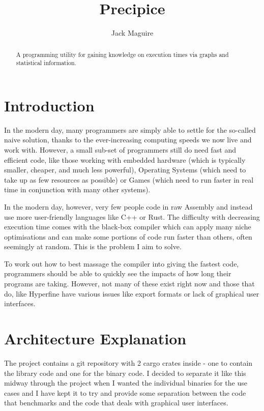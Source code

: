 \documentclass{article}
\title{Precipice}
\author{Jack Maguire}
\date{}
\begin{document}
\maketitle

\begin{abstract}
	A programming utility for gaining knowledge on execution times via graphs and statistical information.
\end{abstract}

\tableofcontents

\newpage

\begin{multicols*}{2}
\section{Introduction}

In the modern day, many programmers are simply able to settle for the so-called naive solution, thanks to the ever-increasing computing speeds we now live and work with. However, a small sub-set of programmers still do need fast and efficient code, like those working with embedded hardware (which is typically smaller, cheaper, and much less powerful), Operating Systems (which need to take up as few resources as possible) or Games (which need to run faster in real time in conjunction with many other systems).

In the modern day, however, very few people code in raw Assembly and instead use more user-friendly languages like C++ or Rust. The difficulty with decreasing execution time comes with the black-box compiler which can apply many niche optimisations and can make some portions of code run faster than others, often seemingly at random. This is the problem I aim to solve.

To work out how to best massage the compiler into giving the fastest code, programmers should be able to quickly see the impacts of how long their programs are taking. However, not many of these exist right now and those that do, like Hyperfine \autocite{peterHyperfine2023} have various issues like export formats or lack of graphical user interfaces.

\section{Architecture Explanation}

The project contains a git repository with 2 cargo crates inside - one to contain the library code and one for the binary code. I decided to separate it like this midway through the project when I wanted the individual binaries for the use cases and I have kept it to try and provide some separation between the code that benchmarks and the code that deals with graphical user interfaces.


\end{multicols*}
\end{document}
